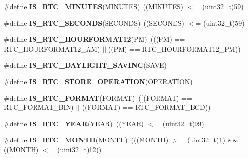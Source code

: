 \begin{DoxyCompactItemize}
\item 
\#define {\bfseries I\+S\+\_\+\+R\+T\+C\+\_\+\+M\+I\+N\+U\+T\+ES}(M\+I\+N\+U\+T\+ES)~((M\+I\+N\+U\+T\+ES) $<$= (uint32\+\_\+t)59)\hypertarget{group___r_t_c___i_s___r_t_c___definitions_ga8475ceaf2d35d98be0b3401812aef445}{}\label{group___r_t_c___i_s___r_t_c___definitions_ga8475ceaf2d35d98be0b3401812aef445}

\item 
\#define {\bfseries I\+S\+\_\+\+R\+T\+C\+\_\+\+S\+E\+C\+O\+N\+DS}(S\+E\+C\+O\+N\+DS)~((S\+E\+C\+O\+N\+DS) $<$= (uint32\+\_\+t)59)\hypertarget{group___r_t_c___i_s___r_t_c___definitions_gadb5a39d98fc906a8ea035bd29308bc5c}{}\label{group___r_t_c___i_s___r_t_c___definitions_gadb5a39d98fc906a8ea035bd29308bc5c}

\item 
\#define {\bfseries I\+S\+\_\+\+R\+T\+C\+\_\+\+H\+O\+U\+R\+F\+O\+R\+M\+A\+T12}(PM)~(((PM) == R\+T\+C\+\_\+\+H\+O\+U\+R\+F\+O\+R\+M\+A\+T12\+\_\+\+AM) $\vert$$\vert$ ((PM) == R\+T\+C\+\_\+\+H\+O\+U\+R\+F\+O\+R\+M\+A\+T12\+\_\+\+PM))\hypertarget{group___r_t_c___i_s___r_t_c___definitions_gaac5777b612cdee4c43d4399f40b1bd3a}{}\label{group___r_t_c___i_s___r_t_c___definitions_gaac5777b612cdee4c43d4399f40b1bd3a}

\item 
\#define {\bfseries I\+S\+\_\+\+R\+T\+C\+\_\+\+D\+A\+Y\+L\+I\+G\+H\+T\+\_\+\+S\+A\+V\+I\+NG}(S\+A\+VE)
\item 
\#define {\bfseries I\+S\+\_\+\+R\+T\+C\+\_\+\+S\+T\+O\+R\+E\+\_\+\+O\+P\+E\+R\+A\+T\+I\+ON}(O\+P\+E\+R\+A\+T\+I\+ON)
\item 
\#define {\bfseries I\+S\+\_\+\+R\+T\+C\+\_\+\+F\+O\+R\+M\+AT}(F\+O\+R\+M\+AT)~(((F\+O\+R\+M\+AT) == R\+T\+C\+\_\+\+F\+O\+R\+M\+A\+T\+\_\+\+B\+IN) $\vert$$\vert$ ((F\+O\+R\+M\+AT) == R\+T\+C\+\_\+\+F\+O\+R\+M\+A\+T\+\_\+\+B\+CD))\hypertarget{group___r_t_c___i_s___r_t_c___definitions_ga05a1ca8558058d71322ccf1045b8fb1c}{}\label{group___r_t_c___i_s___r_t_c___definitions_ga05a1ca8558058d71322ccf1045b8fb1c}

\item 
\#define {\bfseries I\+S\+\_\+\+R\+T\+C\+\_\+\+Y\+E\+AR}(Y\+E\+AR)~((Y\+E\+AR) $<$= (uint32\+\_\+t)99)\hypertarget{group___r_t_c___i_s___r_t_c___definitions_gae59c9cfe6f9532ab26d74c25bcbe814b}{}\label{group___r_t_c___i_s___r_t_c___definitions_gae59c9cfe6f9532ab26d74c25bcbe814b}

\item 
\#define {\bfseries I\+S\+\_\+\+R\+T\+C\+\_\+\+M\+O\+N\+TH}(M\+O\+N\+TH)~(((M\+O\+N\+TH) $>$= (uint32\+\_\+t)1) \&\& ((M\+O\+N\+TH) $<$= (uint32\+\_\+t)12))\hypertarget{group___r_t_c___i_s___r_t_c___definitions_ga7fa60f17b2ae529c35b1fa3dd4d6853f}{}\label{group___r_t_c___i_s___r_t_c___definitions_ga7fa60f17b2ae529c35b1fa3dd4d6853f}


\end{DoxyCompactItemize}
